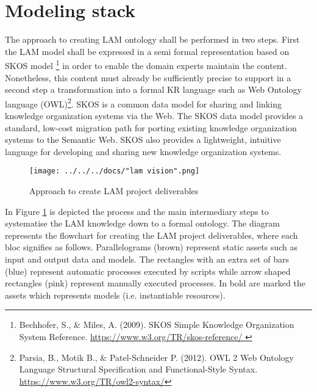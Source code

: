 
\section{Modeling stack}\label{ariaid-title134}

The approach to creating LAM ontology shall be performed in two steps.
First the LAM model shall be expressed in a semi formal representation
based on SKOS model \footnote{Bechhofer, S., \& 	Miles, A. (2009). SKOS Simple Knowledge Organization System Reference. \url{https://www.w3.org/TR/skos-reference/ }} in
order to enable the domain experts maintain the content. Nonetheless,
this content must already be sufficiently precise to support in a second
step a transformation into a formal KR language such as Web Ontology
language (OWL)\footnote{Parsia, B., Motik B.,  \& Patel-Schneider P. (2012). OWL 2 Web Ontology Language Structural Specification and Functional-Style Syntax. \url{https://www.w3.org/TR/owl2-syntax/}}. 
SKOS is a common data model for sharing and linking knowledge organization systems via the Web. The SKOS data model provides a standard, low-cost migration path for porting existing knowledge organization systems to the Semantic Web. SKOS also provides a lightweight, intuitive language for developing and sharing new knowledge organization systems.

\begin{figure}[!ht]
	\centering
	\texttt{[image: ../../../docs/"lam vision".png]}
	\caption{Approach to create LAM project deliverables}
	\label{fig:process-fig}
\end{figure}


In Figure \ref{fig:process-fig} is depicted the process and the main intermediary steps
to systematise the LAM knowledge down to a formal ontology. The diagram
represents the flowchart for creating the LAM project deliverables,
where each bloc signifies as follows. Parallelograms (brown) represent
static assets such as input and output data and models. The rectangles
with an extra set of bars (blue) represent automatic processes executed
by scripts while arrow shaped rectangles (pink) represent manually
executed processes. In bold are marked the assets which represents
models (i.e. instantiable resources).


